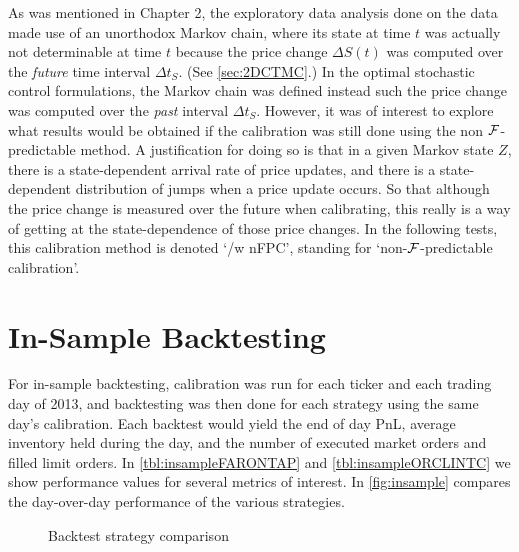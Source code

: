 As was mentioned in Chapter 2, the exploratory data analysis done on the data made use of an unorthodox Markov chain, where its state at time $t$ was actually not determinable at time $t$ because the price change $\Delta S(t)$ was computed over the \emph{future} time interval $\Delta t_S$. (See \autoref{sec:2DCTMC}.) In the optimal stochastic control formulations, the Markov chain was defined instead such the price change was computed over the \emph{past} interval $\Delta t_S$. However, it was of interest to explore what results would be obtained if the calibration was still done using the non $\mathcal{F}$-predictable method. A justification for doing so is that in a given Markov state $Z$, there is a state-dependent arrival rate of price updates, and there is a state-dependent distribution of jumps when a price update occurs. So that although the price change is measured over the future when calibrating, this really is a way of getting at the state-dependence of those price changes. In the following tests, this calibration method is denoted `/w nFPC', standing for `non-$\mathcal{F}$-predictable calibration'.

\section{In-Sample Backtesting}

For in-sample backtesting, calibration was run for each ticker and each trading day of 2013, and backtesting was then done for each strategy using the same day's calibration. Each backtest would yield the end of day PnL, average inventory held during the day, and the number of executed market orders and filled limit orders. In \autoref{tbl:insampleFARONTAP} and \autoref{tbl:insampleORCLINTC} we show performance values for several metrics of interest. In \autoref{fig:insample} compares the day-over-day performance of the various strategies. 

\begin{figure}
  \centering
  \setlength{} 
  \setlength{}
  
  \caption{Backtest strategy comparison}
  \label{fig:insample}
\end{figure}

